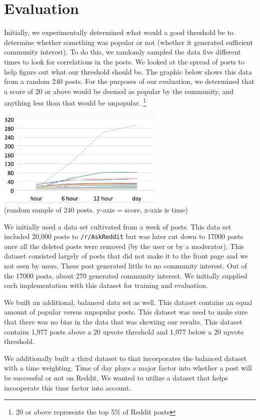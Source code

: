 \documentclass{acm_proc_article-sp}
\begin{document}
\section{Evaluation}
Initially, we experimentally determined what would a good threshold be to determine whether something was popular or not (whether it generated sufficient community interest). To do this, we randomly sampled the data five different times to look for correlations in the posts. We looked at the spread of posts to help figure out what our threshold should be. The graphic below shows this data from a random 240 posts. For the purposes of our evaluation, we determined that a score of 20 or above would be deemed as popular by the community, and anything less than that would be unpopular. \footnote{20 or above represents the top 5\% of Reddit posts}

\includegraphics[width=8cm]{evaluation.jpg}\\
(random sample of 240 posts. y-axis = score, x-axis is time)

We initially used a data set cultivated from a week of posts. This data set included 20,000 posts to \texttt{/r/AskReddit} but was later cut down to 17000 posts once all the deleted posts were removed (by the user or by a moderator). This dataset consisted largely of posts that did not make it to the front page and we not seen by users. These post generated little to no community interest. Out of the 17000 posts, about 270 generated community interest. We initially supplied each implementation with this dataset for training and evaluation.

We built an additional, balanced data set as well. This dataset contains an equal amount of popular versus unpopular posts. This dataset was used to make sure that there was no bias in the data that was skewiing our results. This dataset contains 1,977 posts above a 20 upvote threshold and 1,977 below a 20 upvote threshold.

We additionally built a third dataset to that incorporates the balanced dataset with a time weighting. Time of day plays a major factor into whether a post will be successful or not on Reddit. We wanted to utilize a dataset that helps incooperate this time factor into account. 
\end{document}
